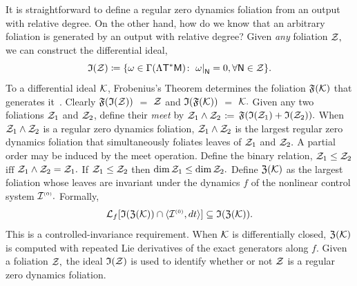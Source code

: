 \documentclass[a4paper]{ifacconf}
\begin{document}
It is straightforward to define a regular zero dynamics foliation from an output with relative degree.
On the other hand, how do we know that an arbitrary foliation is generated by an output with relative degree?
%
Given \emph{any} foliation \(\mathcal{Z},\) we can construct the differential ideal,
\[
  \mathfrak{I}(\mathcal{Z})
    \coloneq
      \{
        \omega \in \Gamma(\Lambda\mathsf{T}^*\mathsf{\mathsf{M}})
        \colon
        \left.\omega\right|_{\mathsf{N}} = 0, \forall \mathsf{N} \in \mathcal{Z}
      \}.
\]
To a differential ideal \(\mathcal{K}\), Frobenius's Theorem determines the foliation \(\mathfrak{F}(\mathcal{K})\) that generates it~\citep{bryant_exterior_1991}.
Clearly \(\mathfrak{F}(\mathfrak{I}(\mathcal{Z}))\) \(=\) \(\mathcal{Z}\) and \(\mathfrak{I}(\mathfrak{F}(\mathcal{K}))\) \(=\) \(\mathcal{K}.\)
Given any two foliations \(\mathcal{Z}_1\) and \(\mathcal{Z}_2\), define their \emph{meet} by
%
\(
  \mathcal{Z}_1 \wedge \mathcal{Z}_2
\)
\(
    \coloneq
\)
\(
      \mathfrak{F}(
        \mathfrak{I}(\mathcal{Z}_1)
        +
        \mathfrak{I}(\mathcal{Z}_2)
      ).
\)
%
When \(\mathcal{Z}_1 \wedge \mathcal{Z}_2\) is a regular zero dynamics foliation, \(\mathcal{Z}_1 \wedge \mathcal{Z}_2\) is the largest regular zero dynamics foliation that simultaneously foliates leaves of \(\mathcal{Z}_1\) and \(\mathcal{Z}_2.\)
A partial order may be induced by the meet operation.
Define the binary relation,
\(
  \mathcal{Z}_1 \leq \mathcal{Z}_2
\)
\(\mathrm{iff}\)
\( 
  \mathcal{Z}_1 \wedge \mathcal{Z}_2 = \mathcal{Z}_1.
\)
If \(\mathcal{Z}_1 \leq \mathcal{Z}_2\) then \(\operatorname{dim}\mathcal{Z}_1 \leq \operatorname{dim}\mathcal{Z}_2.\)
%
Define \(\mathfrak{Z}(\mathcal{K})\) as the largest foliation whose leaves are invariant under the dynamics \(f\) of the nonlinear control system \(\mathcal{I}^{\smash{\scriptscriptstyle(0)}}.\)
Formally,
%
\begin{equation}
  \label{eqn:controlled-invariance}
  \operatorname{\mathcal{L}}_{f} [
    \mathfrak{I}(\mathfrak{Z}(\mathcal{K}))
    \cap
    \langle \mathcal{I}^{\smash{\scriptscriptstyle(0)}}, dt \rangle
  ]
  \subseteq
    \mathfrak{I}(\mathfrak{Z}(\mathcal{K})).
\end{equation}
%
This is a controlled-invariance requirement.
When \(\mathcal{K}\) is differentially closed, \(\mathfrak{Z}(\mathcal{K})\) is computed with repeated Lie derivatives of the exact generators along \(f.\)
%
Given a foliation \(\mathcal{Z},\) the ideal \(\mathfrak{I}(\mathcal{Z})\) is used to identify whether or not \(\mathcal{Z}\) is a regular zero dynamics foliation.
\end{document}
